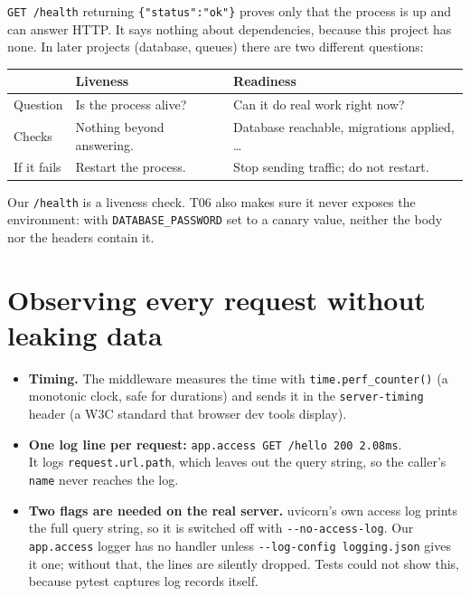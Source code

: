 \documentclass[11pt,a4paper]{article}
\newcommand{\code}[1]{\texttt{#1}}
\begin{document}
\code{GET /health} returning \code{\{"status":"ok"\}} proves only that the
process is up and can answer HTTP. It says nothing about dependencies,
because this project has none. In later projects (database, queues) there are
two different questions:

\begin{tabularx}{\linewidth}{@{}l L L@{}}
\toprule
& \textbf{Liveness} & \textbf{Readiness} \\
\midrule
Question & Is the process alive? & Can it do real work right now? \\
Checks & Nothing beyond answering. & Database reachable, migrations applied, \dots \\
If it fails & Restart the process. & Stop sending traffic; do not restart. \\
\bottomrule
\end{tabularx}

Our \code{/health} is a liveness check. T06 also makes sure it never exposes
the environment: with \code{DATABASE\_PASSWORD} set to a canary value, neither
the body nor the headers contain it.

\section{Observing every request without leaking data}

\begin{itemize}
  \item \textbf{Timing.} The middleware measures the time with
        \code{time.perf\_counter()} (a monotonic clock, safe for durations) and
        sends it in the \code{server-timing} header (a W3C standard that
        browser dev tools display).
  \item \textbf{One log line per request:}
        \code{app.access GET /hello 200 2.08ms}.\\
        It logs \code{request.url.path}, which leaves out the query string, so the
        caller's \code{name} never reaches the log.
  \item \textbf{Two flags are needed on the real server.} uvicorn's own access
        log prints the full query string, so it is switched off with
        \code{-{}-no-access-log}. Our \code{app.access} logger has no handler
        unless \code{-{}-log-config logging.json} gives it one; without that,
        the lines are silently dropped. Tests could not show this, because
        pytest captures log records itself.
\end{itemize}
\end{document}
